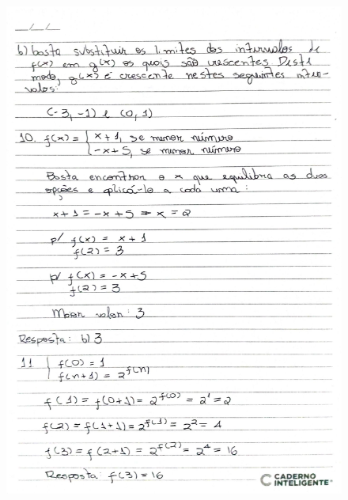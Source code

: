 \documentclass[
  12pt,     %
  openright,      %
  oneside,      %
  a4paper     %
  ]{abntex2}
\begin{document}
\begin{figure}[H]
  \centering
  \includegraphics[scale=0.23]{pagina17.jpg}
\end{figure}
\end{document}

